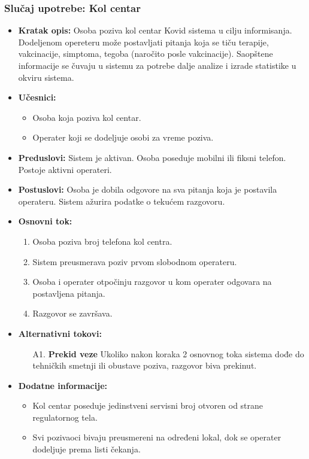 \documentclass[titlepage]{article}
\begin{document}
\subsubsection{Slučaj upotrebe: Kol centar}
\begin{itemize}
\item \textbf{Kratak opis:} Osoba poziva kol centar Kovid sistema u cilju informisanja. Dodeljenom opereteru može postavljati pitanja koja se tiču terapije, vakcinacije, simptoma, tegoba (naročito posle vakcinacije). Saopštene informacije se čuvaju u sistemu za potrebe dalje analize i izrade statistike u okviru sistema.
\item \textbf{Učesnici:}
\begin{itemize}
    \item Osoba koja poziva kol centar.
    \item Operater koji se dodeljuje osobi za vreme poziva.
\end{itemize}
 \item \textbf{Preduslovi:} Sistem je aktivan. Osoba poseduje mobilni ili fiksni telefon. Postoje aktivni operateri.
 \item \textbf{Postuslovi:} Osoba je dobila odgovore na sva pitanja koja je postavila operateru. Sistem ažurira podatke o tekućem razgovoru.
 \item \textbf{Osnovni tok:}
 \begin{enumerate}
    \item Osoba poziva broj telefona kol centra.
    \item Sistem preusmerava poziv prvom slobodnom operateru.
    \item Osoba i operater otpočinju razgovor u kom operater odgovara na postavljena pitanja.
    \item Razgovor se završava.
 \end{enumerate}
 \item \textbf{Alternativni tokovi:}
 \begin{itemize}
            \item[A1.] \textbf{Prekid veze} Ukoliko nakon koraka 2 osnovnog toka sistema dođe do tehničkih smetnji ili obustave poziva, razgovor biva prekinut.
        \end{itemize}
 \item \textbf{Dodatne informacije:}
            \begin{itemize}
                \item Kol centar poseduje jedinstveni servisni broj otvoren od strane regulatornog tela.
                \item Svi pozivaoci bivaju preusmereni na određeni lokal, dok se operater dodeljuje prema listi čekanja.
            \end{itemize}

\end{itemize}
\end{document}
